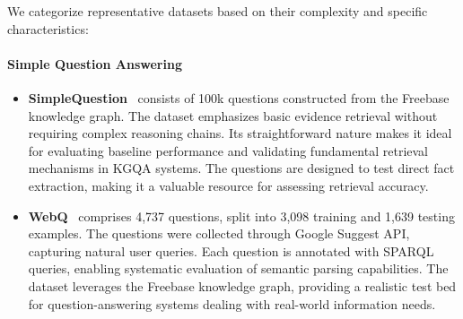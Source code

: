 \documentclass[lettersize,journal]{IEEEtran}
\begin{document}
We categorize representative datasets based on their complexity and specific characteristics:
\paragraph{Simple Question Answering}
\begin{itemize}
    \item \textbf{SimpleQuestion}~\cite{bordes2015large} consists of 100k questions constructed from the Freebase knowledge graph. The dataset emphasizes basic evidence retrieval without requiring complex reasoning chains. Its straightforward nature makes it ideal for evaluating baseline performance and validating fundamental retrieval mechanisms in KGQA systems. The questions are designed to test direct fact extraction, making it a valuable resource for assessing retrieval accuracy.
    \item \textbf{WebQ}~\cite{berant2013semantic} comprises 4,737 questions, split into 3,098 training and 1,639 testing examples. The questions were collected through Google Suggest API, capturing natural user queries. Each question is annotated with SPARQL queries, enabling systematic evaluation of semantic parsing capabilities. The dataset leverages the Freebase knowledge graph, providing a realistic test bed for question-answering systems dealing with real-world information needs.
\end{itemize}
\end{document}
